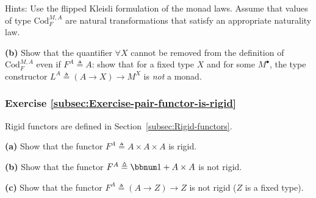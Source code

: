 Hints: Use the flipped Kleisli formulation of the monad laws. Assume
that values of type $\text{Cod}_{F}^{M,A}$ are natural transformations
that satisfy an appropriate naturality law.

\textbf{(b)} Show that the quantifier $\forall X$ cannot be removed
from the definition of $\text{Cod}_{F}^{M,A}$ even if $F^{A}\triangleq A$:
show that for a fixed type $X$ and for some $M^{\bullet}$, the type
constructor $L^{A}\triangleq(A\rightarrow X)\rightarrow M^{X}$ is
\emph{not} a monad.

\subsubsection{Exercise \label{subsec:Exercise-pair-functor-is-rigid}\ref{subsec:Exercise-pair-functor-is-rigid}}

Rigid functors are defined in Section~\ref{subsec:Rigid-functors}.

\textbf{(a)} Show that the functor $F^{A}\triangleq A\times A\times A$
is rigid. 

\textbf{(b)} Show that the functor $F^{A}\triangleq\bbnum 1+A\times A$
is not rigid. 

\textbf{(c)} Show that the functor $F^{A}\triangleq\left(A\rightarrow Z\right)\rightarrow Z$
is not rigid ($Z$ is a fixed type).

